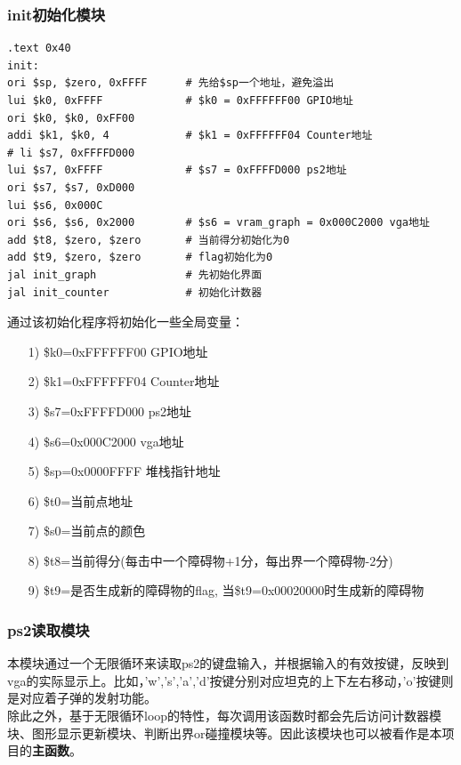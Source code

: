 \subsubsection{init初始化模块}

\begin{lstlisting}[frame=shadowbox]
.text 0x40
init:
ori $sp, $zero, 0xFFFF      # 先给$sp一个地址，避免溢出
lui $k0, 0xFFFF             # $k0 = 0xFFFFFF00 GPIO地址
ori $k0, $k0, 0xFF00        
addi $k1, $k0, 4            # $k1 = 0xFFFFFF04 Counter地址
# li $s7, 0xFFFFD000
lui $s7, 0xFFFF             # $s7 = 0xFFFFD000 ps2地址
ori $s7, $s7, 0xD000
lui $s6, 0x000C       
ori $s6, $s6, 0x2000        # $s6 = vram_graph = 0x000C2000 vga地址
add $t8, $zero, $zero       # 当前得分初始化为0
add $t9, $zero, $zero       # flag初始化为0
jal init_graph              # 先初始化界面
jal init_counter            # 初始化计数器
\end{lstlisting}

通过该初始化程序将初始化一些全局变量：
\begin{itemize}
    \item[1)] \$k0=0xFFFFFF00 GPIO地址
    \item[2)] \$k1=0xFFFFFF04 Counter地址
    \item[3)] \$s7=0xFFFFD000 ps2地址
    \item[4)] \$s6=0x000C2000 vga地址
    \item[5)] \$sp=0x0000FFFF 堆栈指针地址
    \item[6)] \$t0=当前点地址
    \item[7)] \$s0=当前点的颜色
    \item[8)] \$t8=当前得分(每击中一个障碍物+1分，每出界一个障碍物-2分)
    \item[9)] \$t9=是否生成新的障碍物的flag, 当\$t9=0x00020000时生成新的障碍物
\end{itemize}

\subsubsection{ps2读取模块}
本模块通过一个无限循环来读取ps2的键盘输入，并根据输入的有效按键，反映到vga的实际显示上。比如，'w','s','a','d'按键分别对应坦克的上下左右移动，'o'按键则是对应着子弹的发射功能。\\

除此之外，基于无限循环loop的特性，每次调用该函数时都会先后访问计数器模块、图形显示更新模块、判断出界or碰撞模块等。因此该模块也可以被看作是本项目的\textbf{主函数}。

